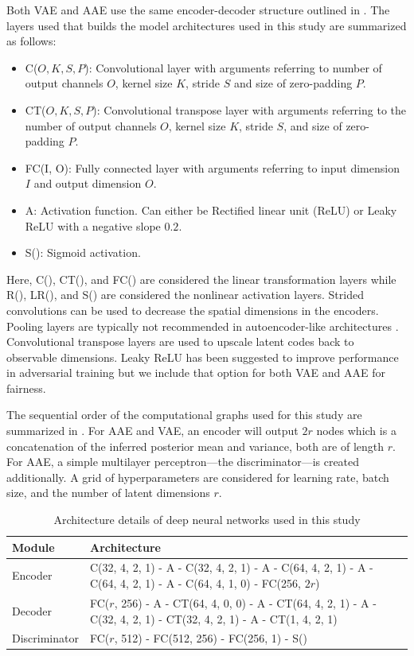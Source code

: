 \documentclass[journal, peerreview]{IEEEtran}
\begin{document}
Both VAE and AAE use the same encoder-decoder structure outlined in .
The layers used that builds the model architectures used in this study are summarized as follows:
 
\begin{itemize}
	\item C($O, K, S, P$): Convolutional layer with arguments referring to number of output channels $O$, kernel size $K$, stride $S$ and size of zero-padding $P$.
	\item CT($O, K, S, P$): Convolutional transpose layer with arguments referring to the number of output channels $O$, kernel size $K$, stride $S$, and size of zero-padding $P$.
	\item FC(I, O): Fully connected layer with arguments referring to input dimension $I$ and output dimension $O$.
	\item A: Activation function. Can either be Rectified linear unit (ReLU) or Leaky ReLU with a negative slope $0.2$.
	\item S(): Sigmoid activation.
\end{itemize}
Here, C(), CT(), and FC() are considered the linear transformation layers while R(), LR(), and S() are considered the nonlinear activation layers. 
Strided convolutions can be used to decrease the spatial dimensions in the encoders. 
Pooling layers are typically not recommended in autoencoder-like architectures \cite{radford2015unsupervised}. 
Convolutional transpose layers are used to upscale latent codes back to observable dimensions. 
Leaky ReLU has been suggested to improve performance in adversarial training \cite{salimans2016improved} but we include that option for both VAE and AAE for fairness.

The sequential order of the computational graphs used for this study are summarized in . 
For AAE and VAE, an encoder will output $2r$ nodes which is a concatenation of the inferred posterior mean and variance, both are of length $r$. 
For AAE, a simple multilayer perceptron---the discriminator---is created additionally.  
A grid of hyperparameters are considered for learning rate, batch size, and the number of latent dimensions $r$.

\begin{table}[!t]
	\renewcommand{\arraystretch}{1.3}
	\caption{Architecture details of deep neural networks used in this study}
	\label{tab:model-architectures}
	\centering
	\begin{tabular}{ll}
		\toprule
		Module & Architecture \\
		\midrule
		Encoder & C(32, 4, 2, 1) - A - C(32, 4, 2, 1) - A - C(64, 4, 2, 1) - A - C(64, 4, 2, 1) - A - C(64, 4, 1, 0) - FC(256, $2r$) \\
		Decoder & FC($r$, 256) - A - CT(64, 4, 0, 0) - A - CT(64, 4, 2, 1) - A - C(32, 4, 2, 1) - CT(32, 4, 2, 1) - A - CT(1, 4, 2, 1) \\ 
		Discriminator & FC($r$, 512) - FC(512, 256) - FC(256, 1) - S() \\
		\bottomrule
	\end{tabular}
\end{table}
\end{document}

